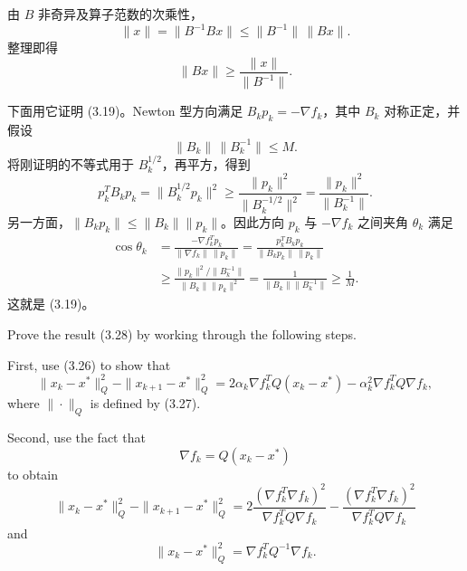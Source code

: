 \documentclass{ctexart}
\begin{document}
\begin{solution}
由 $B$ 非奇异及算子范数的次乘性，
\[
    \|x\|=\|B^{-1}Bx\|
    \leq\|B^{-1}\|\,\|Bx\|.
\]
整理即得
\[
    \boxed{\|Bx\|\geq\frac{\|x\|}{\|B^{-1}\|}}.
\]

下面用它证明 (3.19)。Newton 型方向满足
$B_kp_k=-\nabla f_k$，其中 $B_k$ 对称正定，并假设
\[
    \|B_k\|\,\|B_k^{-1}\|\leq M.
\]
将刚证明的不等式用于 $B_k^{1/2}$，再平方，得到
\[
    p_k^TB_kp_k=\|B_k^{1/2}p_k\|^2
    \geq\frac{\|p_k\|^2}{\|B_k^{-1/2}\|^2}
    =\frac{\|p_k\|^2}{\|B_k^{-1}\|}.
\]
另一方面，$\|B_kp_k\|\leq\|B_k\|\|p_k\|$。因此方向 $p_k$ 与
$-\nabla f_k$ 之间夹角 $\theta_k$ 满足
\begin{align*}
\cos\theta_k
&=\frac{-\nabla f_k^Tp_k}{\|\nabla f_k\|\,\|p_k\|}
=\frac{p_k^TB_kp_k}{\|B_kp_k\|\,\|p_k\|}\\
&\geq
\frac{\|p_k\|^2/\|B_k^{-1}\|}
     {\|B_k\|\|p_k\|^2}
=\frac1{\|B_k\|\|B_k^{-1}\|}
\geq\frac1M.
\end{align*}
这就是 (3.19)。
\end{solution}

\begin{problem}[3.7]
Prove the result (3.28) by working through the following steps.

First, use (3.26) to show that
\[
    \|x_k-x^*\|_Q^2-\|x_{k+1}-x^*\|_Q^2
    =
    2\alpha_k\nabla f_k^TQ(x_k-x^*)
    -\alpha_k^2\nabla f_k^TQ\nabla f_k,
\]
where $\|\cdot\|_Q$ is defined by (3.27).

Second, use the fact that
\[
    \nabla f_k=Q(x_k-x^*)
\]
to obtain
\[
    \|x_k-x^*\|_Q^2-\|x_{k+1}-x^*\|_Q^2
    =
    2\frac{(\nabla f_k^T\nabla f_k)^2}
            {\nabla f_k^TQ\nabla f_k}
    -
    \frac{(\nabla f_k^T\nabla f_k)^2}
         {\nabla f_k^TQ\nabla f_k}
\]
and
\[
    \|x_k-x^*\|_Q^2
    =
    \nabla f_k^TQ^{-1}\nabla f_k.
\]
\end{problem}
\end{document}

